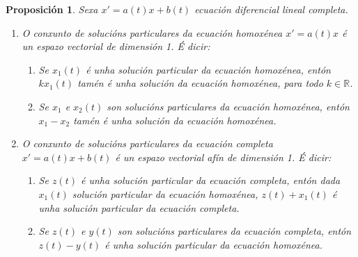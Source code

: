 \documentclass[11pt, a4paper,twoside]{article}
\theoremstyle{theorem-style}  %
\newtheorem{proposition}[theorem]{Proposición}
\theoremstyle{definition-style}
\theoremstyle{example-style}
\begin{document}
\begin{proposition}
	Sexa $ x'=a(t)x +b(t) $ ecuación diferencial lineal completa.
	\begin{enumerate}
		\item O conxunto de solucións particulares da ecuación homoxénea $ x'=a(t)x $ é un espazo vectorial de dimensión 1. É dicir:
		\begin{enumerate}[\quad a)]
			\item Se $ x_1(t) $ é unha solución particular da ecuación homoxénea, entón $ kx_1(t) $ tamén é unha solución da ecuación homoxénea, para todo $ k\in \mathbb{R} $.
			\item Se $ x_1 $ e $ x_2(t) $ son solucións particulares da ecuación homoxénea, entón $ x_1-x_2 $ tamén é unha solución da ecuación homoxénea.
		\end{enumerate}
	\item O conxunto de solucións particulares da ecuación completa $  x'=a(t)x +b(t) $ é un espazo vectorial afín de dimensión 1. É dicir:
	\begin{enumerate}[\quad a)]
		\item Se $ z(t) $ é unha solución particular da ecuación completa, entón dada $ x_1(t) $ solución particular da ecuación homoxénea, $ z(t)+x_1(t) $ é unha solución particular da ecuación completa.
		\item Se $ z(t) $ e $ y(t) $ son solucións particulares da ecuación completa, entón $ z(t)-y(t) $ é unha solución particular da ecuación homoxénea.
	\end{enumerate}
	\end{enumerate}
\end{proposition}
\end{document}
